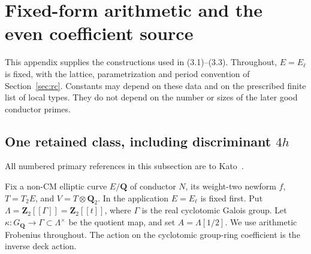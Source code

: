 

\section{Fixed-form arithmetic and the even coefficient source}\label{app:even-source}
This appendix supplies the constructions used in (3.1)--(3.3).
Throughout, $E=E_\ell$ is fixed, with the lattice, parametrization and
period convention of Section~\ref{sec:rc}. Constants may depend on these
data and on the prescribed finite list of local types. They do not depend
on the number or sizes of the later good conductor primes.

\subsection{One retained class, including discriminant \texorpdfstring{$4h$}{4h}}
All numbered primary references in this subsection are to Kato~\cite{kato}.

Fix a non-CM elliptic curve $E/\mathbf Q$ of conductor $N$, its weight-two newform $f$,
$T=T_2E$, and $V=T\otimes\mathbf Q_2$. In the application
$E=E_\ell$ is fixed first. Put
$\Lambda=\mathbf Z_2[[\Gamma]]=\mathbf Z_2[[t]]$, where $\Gamma$
is the real cyclotomic Galois group. Let
$\kappa:G_{\mathbf Q}\to\Gamma\subset\Lambda^\times$ be the quotient map,
and set $A=\Lambda[1/2]$.
We use arithmetic Frobenius throughout. The action on the cyclotomic
group-ring coefficient is the inverse deck action.

